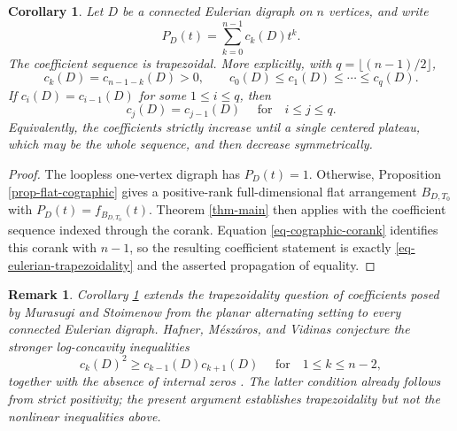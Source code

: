 \documentclass[12pt]{amsart}
\newtheorem{corollary}[theorem]{Corollary}
\newtheorem{remark}[theorem]{Remark}
\numberwithin{equation}{section}
\numberwithin{theorem}{section}
\begin{document}
\begin{corollary}
  \label{cor-eulerian-digraph-trapezoidality}
  Let $D$ be a connected Eulerian digraph on $n$ vertices, and write
  \begin{equation*}
    P_D(t)=\sum_{k=0}^{n-1}c_k(D)t^k.
  \end{equation*}
  The coefficient sequence is trapezoidal. More explicitly, with $q=\lfloor(n-1)/2\rfloor$,
  \begin{equation}
    \label{eq-eulerian-trapezoidality}
    c_k(D)=c_{n-1-k}(D)>0, \qquad c_0(D)\leq c_1(D)\leq\cdots\leq c_q(D).
  \end{equation}
  If $c_i(D)=c_{i-1}(D)$ for some $1\leq i\leq q$, then
  \begin{equation*}
    c_j(D)=c_{j-1}(D)\quad \text{  for}\quad i\leq j\leq q.
  \end{equation*}
  Equivalently, the coefficients strictly increase until a single centered plateau, which may be the whole sequence, and then decrease symmetrically.
\end{corollary}
\begin{proof}
  The loopless one-vertex digraph has $P_D(t)=1$. Otherwise, Proposition \ref{prop-flat-cographic} gives a positive-rank full-dimensional flat arrangement $B_{D,T_0}$ with $P_D(t)=f_{B_{D,T_0}}(t)$. 
  Theorem \ref{thm-main} then applies with the coefficient sequence indexed through the corank. 
  Equation \eqref{eq-cographic-corank} identifies this corank with $n-1$, so the resulting coefficient statement is exactly \eqref{eq-eulerian-trapezoidality} and the asserted propagation of equality.
\end{proof}


\begin{remark}
  Corollary \ref{cor-eulerian-digraph-trapezoidality} extends the trapezoidality question of coefficients posed by Murasugi and Stoimenow from the planar alternating setting to every connected Eulerian digraph. Hafner, Mészáros, and Vidinas conjecture the stronger log-concavity inequalities
  \begin{equation*}
    c_k(D)^2\geq c_{k-1}(D)c_{k+1}(D)\quad\text{  for} \quad 1\leq k\leq n-2,
  \end{equation*}
  together with the absence of internal zeros \cite[Conjecture~1.6]{HMVGeneralized}. The latter condition already follows from strict positivity; the present argument establishes trapezoidality but not the nonlinear inequalities above.
\end{remark}




\printbibliography
\end{document}
